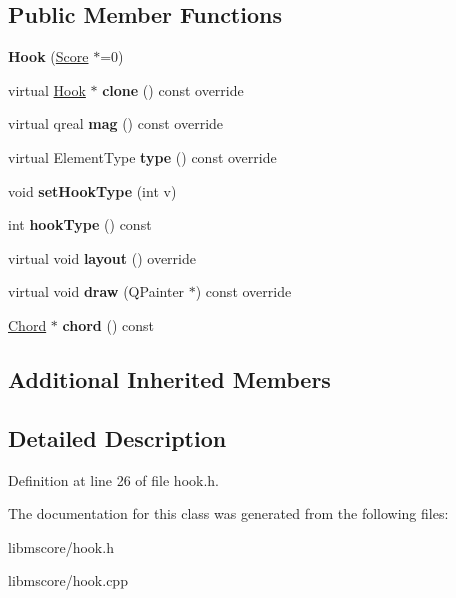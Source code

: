 \subsection*{Public Member Functions}
\begin{DoxyCompactItemize}
\item 
\mbox{\label{class_ms_1_1_hook_a8ace582c3301f39fc3c010ffa25cd101}} 
{\bfseries Hook} (\hyperlink{class_ms_1_1_score}{Score} $\ast$=0)
\item 
\mbox{\label{class_ms_1_1_hook_aa10aeb0828f0d3f47afee7ee26facb85}} 
virtual \hyperlink{class_ms_1_1_hook}{Hook} $\ast$ {\bfseries clone} () const override
\item 
\mbox{\label{class_ms_1_1_hook_aab8ee8c6fb2fd43a3efd330cc3ec718f}} 
virtual qreal {\bfseries mag} () const override
\item 
\mbox{\label{class_ms_1_1_hook_a30b0ca2ee0d5e369c9a7ce113c063963}} 
virtual Element\+Type {\bfseries type} () const override
\item 
\mbox{\label{class_ms_1_1_hook_a10253da01951c36f62fa9ab428ff28b4}} 
void {\bfseries set\+Hook\+Type} (int v)
\item 
\mbox{\label{class_ms_1_1_hook_a3402ae85aaf17e6bb2a9be75325dbc47}} 
int {\bfseries hook\+Type} () const
\item 
\mbox{\label{class_ms_1_1_hook_a8665fd50a02d599919a52644bc87e2ab}} 
virtual void {\bfseries layout} () override
\item 
\mbox{\label{class_ms_1_1_hook_a31822972be94270155c23ee4add359d3}} 
virtual void {\bfseries draw} (Q\+Painter $\ast$) const override
\item 
\mbox{\label{class_ms_1_1_hook_a2c0f6d58948b10bea8e0fae8ad290b41}} 
\hyperlink{class_ms_1_1_chord}{Chord} $\ast$ {\bfseries chord} () const
\end{DoxyCompactItemize}
\subsection*{Additional Inherited Members}


\subsection{Detailed Description}


Definition at line 26 of file hook.\+h.



The documentation for this class was generated from the following files\+:\begin{DoxyCompactItemize}
\item 
libmscore/hook.\+h\item 
libmscore/hook.\+cpp\end{DoxyCompactItemize}
